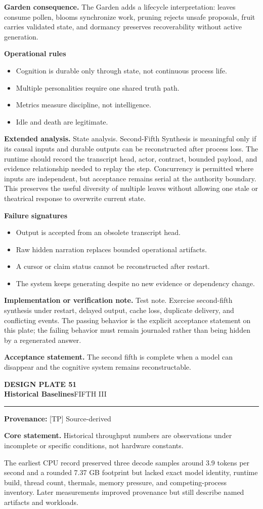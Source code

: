 \documentclass[10pt,letterpaper,oneside]{article}
\newcommand{\prov}[1]{\textcolor{gardenBlue}{\sffamily\footnotesize\textbf{Provenance:} #1}}
\newcommand{\platetitle}[3]{%
  \begin{minipage}[t][0.54in][t]{\textwidth}
  {\sffamily\bfseries\color{gardenDeep}\fontsize{9}{10}\selectfont DESIGN PLATE #1}\\[-1pt]
  {\sffamily\bfseries\color{gardenInk}\fontsize{16.5}{18}\selectfont #2}\hfill{\sffamily\color{gardenGreen}\large #3}
  \end{minipage}\vspace{-2pt}\hrule\vspace{5pt}}
\begin{document}
\textbf{Garden consequence.} The Garden adds a lifecycle interpretation: leaves consume pollen, blooms synchronize work, pruning rejects unsafe proposals, fruit carries validated state, and dormancy preserves recoverability without active generation.

\textbf{Operational rules}
\begin{itemize}
\item Cognition is durable only through state, not continuous process life.
\item Multiple personalities require one shared truth path.
\item Metrics measure discipline, not intelligence.
\item Idle and death are legitimate.
\end{itemize}
\textbf{Extended analysis.} State analysis. Second-Fifth Synthesis is meaningful only if its causal inputs and durable outputs can be reconstructed after process loss. The runtime should record the transcript head, actor, contract, bounded payload, and evidence relationship needed to replay the step. Concurrency is permitted where inputs are independent, but acceptance remains serial at the authority boundary. This preserves the useful diversity of multiple leaves without allowing one stale or theatrical response to overwrite current state.

\textbf{Failure signatures}
\begin{itemize}
\item Output is accepted from an obsolete transcript head.
\item Raw hidden narration replaces bounded operational artifacts.
\item A cursor or claim status cannot be reconstructed after restart.
\item The system keeps generating despite no new evidence or dependency change.
\end{itemize}
\textbf{Implementation or verification note.} Test note. Exercise second-fifth synthesis under restart, delayed output, cache loss, duplicate delivery, and conflicting events. The passing behavior is the explicit acceptance statement on this plate; the failing behavior must remain journaled rather than being hidden by a regenerated answer.

\begin{acceptbox}
\textbf{Acceptance statement.} The second fifth is complete when a model can disappear and the cognitive system remains reconstructable.
\end{acceptbox}
\newpage
\platetitle{51}{Historical Baselines}{FIFTH III}
\prov{[TP] Source-derived}
\fontsize{8.85}{10.45}\selectfont
\begin{corebox}
\textbf{Core statement.} Historical throughput numbers are observations under incomplete or specific conditions, not hardware constants.
\end{corebox}
The earliest CPU record preserved three decode samples around 3.9 tokens per second and a rounded 7.37 GB footprint but lacked exact model identity, runtime build, thread count, thermals, memory pressure, and competing-process inventory. Later measurements improved provenance but still describe named artifacts and workloads.
\end{document}
